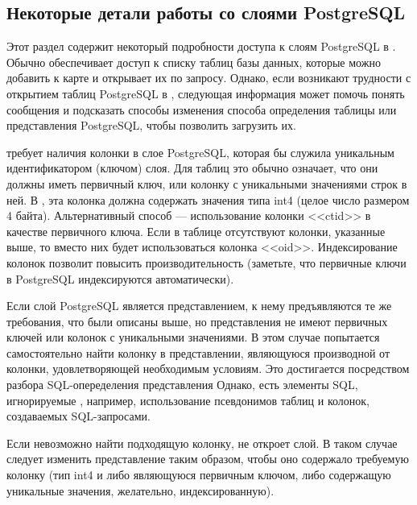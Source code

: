 \subsection{Некоторые детали работы со слоями PostgreSQL}
\label{sec:postgis_details}

Этот раздел содержит некоторый подробности доступа к слоям PostgreSQL в \qg.
Обычно \qg обеспечивает доступ к списку таблиц
базы данных, которые можно добавить к карте и открывает их по запросу. Однако,
если возникают трудности с открытием таблиц PostgreSQL в \qg, следующая
информация может помочь понять сообщения \qg и подсказать способы
изменения способа определения таблицы или представления PostgreSQL, чтобы позволить \qg загрузить их.

\qg требует наличия колонки в слое PostgreSQL,
которая бы служила уникальным идентификатором (ключом) слоя. Для таблиц это обычно означает, что
они должны иметь первичный ключ, или колонку с уникальными значениями строк в ней. %
В \qg, эта колонка должна содержать значения
типа int4 (целое число размером 4 байта). Альтернативный способ --- использование колонки <<ctid>>
в качестве первичного ключа. Если в таблице отсутствуют колонки, указанные выше,
то вместо них будет использоваться колонка <<oid>>. Индексирование колонок позволит
повысить производительность (заметьте, что первичные ключи в
PostgreSQL индексируются автоматически).

Если слой PostgreSQL является представлением, к нему предъявляются те же требования, что были описаны выше,
но представления не имеют первичных ключей или колонок с уникальными значениями.
В этом случае \qg попытается самостоятельно найти колонку в представлении,
являющуюся производной от колонки, удовлетворяющей необходимым условиям. %
Это достигается посредством разбора SQL-опеределения представления %
Однако, есть элементы SQL, игнорируемые \qg,
например, использование псевдонимов таблиц и колонок, создаваемых SQL-запросами.

Если невозможно найти подходящую колонку, \qg не откроет слой.
В таком случае следует изменить представление таким образом, чтобы оно
содержало требуемую колонку (тип int4 и либо являющуюся первичным ключом, либо содержащую уникальные значения,
желательно, индексированную).

